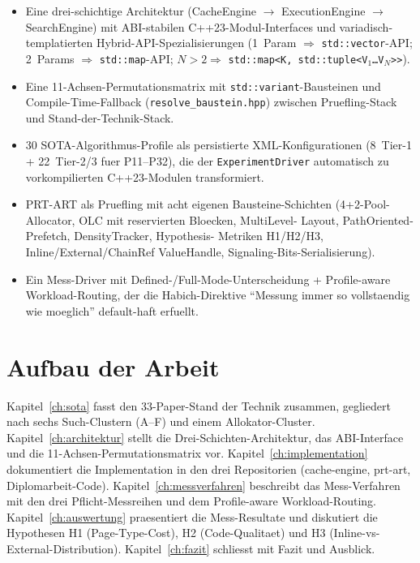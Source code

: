 \begin{itemize}
    \item Eine drei-schichtige Architektur (CacheEngine $\to$
          ExecutionEngine $\to$ SearchEngine) mit ABI-stabilen
          C++23-Modul-Interfaces und variadisch-templatierten
          Hybrid-API-Spezialisierungen (1~Param $\Rightarrow$
          \texttt{std::vector}-API; 2~Params $\Rightarrow$
          \texttt{std::map}-API; $N>2 \Rightarrow$
          \texttt{std::map<K, std::tuple<V$_1$\ldots V$_N$>>}).

    \item Eine 11-Achsen-Permutationsmatrix mit
          \texttt{std::variant}-Bausteinen und Compile-Time-Fallback
          (\texttt{resolve\_baustein.hpp}) zwischen Pruefling-Stack und
          Stand-der-Technik-Stack.

    \item 30 SOTA-Algorithmus-Profile als persistierte XML-Konfigurationen
          (8~Tier-1 + 22~Tier-2/3 fuer P11--P32), die der
          \texttt{ExperimentDriver} automatisch zu vorkompilierten
          C++23-Modulen transformiert.

    \item PRT-ART als Pruefling mit acht eigenen Bausteine-Schichten
          (4+2-Pool-Allocator, OLC mit reservierten Bloecken, MultiLevel-
          Layout, PathOriented-Prefetch, DensityTracker, Hypothesis-
          Metriken H1/H2/H3, Inline/External/ChainRef ValueHandle,
          Signaling-Bits-Serialisierung).

    \item Ein Mess-Driver mit Defined-/Full-Mode-Unterscheidung +
          Profile-aware Workload-Routing, der die Habich-Direktive
          ``Messung immer so vollstaendig wie moeglich'' default-haft
          erfuellt.
\end{itemize}

\section{Aufbau der Arbeit}

Kapitel~\ref{ch:sota} fasst den 33-Paper-Stand der Technik zusammen,
gegliedert nach sechs Such-Clustern (A--F) und einem Allokator-Cluster.
Kapitel~\ref{ch:architektur} stellt die Drei-Schichten-Architektur,
das ABI-Interface und die 11-Achsen-Permutationsmatrix vor.
Kapitel~\ref{ch:implementation} dokumentiert die Implementation in den
drei Repositorien (cache-engine, prt-art, Diplomarbeit-Code).
Kapitel~\ref{ch:messverfahren} beschreibt das Mess-Verfahren mit den
drei Pflicht-Messreihen und dem Profile-aware Workload-Routing.
Kapitel~\ref{ch:auswertung} praesentiert die Mess-Resultate und
diskutiert die Hypothesen H1 (Page-Type-Cost), H2 (Code-Qualitaet) und
H3 (Inline-vs-External-Distribution). Kapitel~\ref{ch:fazit} schliesst
mit Fazit und Ausblick.
